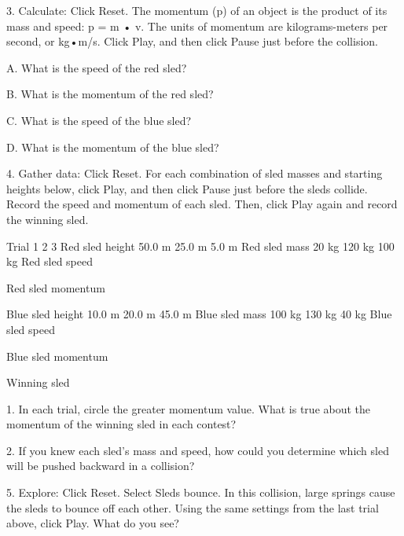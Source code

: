 	

               3. Calculate: Click Reset. The momentum (p) of an object is the product of its mass and speed: p = m • v. The units of momentum are kilograms-meters per second, or kg•m/s. Click Play, and then click Pause just before the collision. 


A. What is the speed of the red sled?        
	

	B. What is the momentum of the red sled?
	

	C. What is the speed of the blue sled?
	

	D. What is the momentum of the blue sled?
	

	







               4. Gather data: Click Reset. For each combination of sled masses and starting heights below, click Play, and then click Pause just before the sleds collide. Record the speed and momentum of each sled. Then, click Play again and record the winning sled.


Trial
	1
	2
	3
	Red sled height
	50.0 m
	25.0 m
	5.0 m
	Red sled mass
	20 kg
	120 kg
	100 kg
	Red sled speed
	

	

	

	Red sled momentum
	

	

	

	Blue sled height
	10.0 m
	20.0 m
	45.0 m
	Blue sled mass
	100 kg
	130 kg
	40 kg
	Blue sled speed
	

	

	

	Blue sled momentum
	

	

	

	Winning sled
	

	

	

	

               1. In each trial, circle the greater momentum value. What is true about the momentum of the winning sled in each contest? 
	

	               2. If you knew each sled’s mass and speed, how could you determine which sled will be pushed backward in a collision?
	

	

               5. Explore: Click Reset. Select Sleds bounce. In this collision, large springs cause the sleds to bounce off each other. Using the same settings from the last trial above, click Play. 
What do you see?                                                                                 




